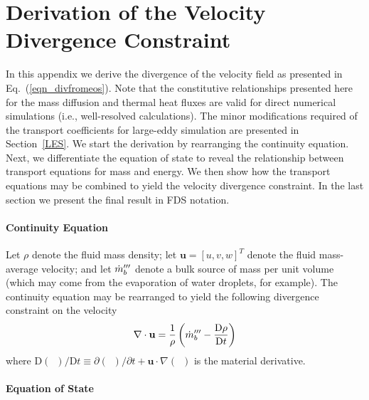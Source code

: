 \documentclass[11pt]{book}
\begin{document}
\chapter{Derivation of the Velocity Divergence Constraint}
\label{app_divergence}


In this appendix we derive the divergence of the velocity field as presented in Eq.~(\ref{eqn_divfromeos}).
Note that the constitutive relationships presented here for the mass diffusion and thermal heat fluxes are valid for direct numerical simulations (i.e., well-resolved calculations).
The minor modifications required of the transport coefficients for large-eddy simulation are presented in Section~\ref{LES}.  We start the derivation by rearranging the continuity equation.
Next, we differentiate the equation of state to reveal the relationship between transport equations for mass and energy.
We then show how the transport equations may be combined to yield the velocity divergence constraint.  In the last section we present the final result in FDS notation.

\subsubsection{Continuity Equation}
\label{continuity}

Let $\rho$ denote the fluid mass density; let $\mathbf{u} = [u,v,w]^T$ denote the fluid mass-average velocity; and let $\dot{m}_b^{{\prime\prime\prime}}$
denote a bulk source of mass per unit volume (which may come from the evaporation of water droplets, for example).
The continuity equation may be rearranged to yield the following divergence constraint on the velocity
\begin{equation}
\label{eqn_divconstraint1}
\nabla\cdot \mathbf{u} = \frac{1}{\rho} \left( \dot{m}_b^{{\prime\prime\prime}} -  \frac{\mbox{D} \rho}{\mbox{D} t} \right)
\end{equation}
where $\mbox{D}(\,\,\,)/\mbox{D} t \equiv \partial (\,\,\,)/\partial t + \mathbf{u}\cdot\nabla(\,\,\,)$ is the material derivative.

\subsubsection{Equation of State}
\label{EOS}
\end{document}
